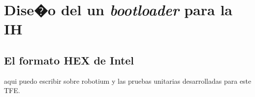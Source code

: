 \chapter{Dise�o del un \textsl{bootloader} para la \acs{IH}}
\label{sec:boot}

\section{El formato HEX de Intel}
\label{sec:boot.hex}

aqui puedo escribir sobre robotium y las pruebas unitarias desarrolladas para este \ac{TFE}.



